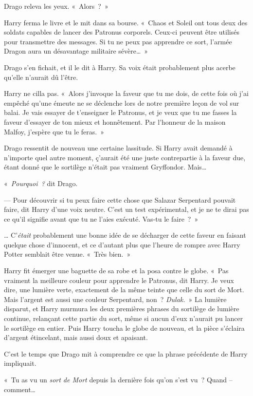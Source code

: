 Drago releva les yeux.
«~Alors~?~»

Harry ferma le livre et le mit dans sa bourse.
«~Chaos et Soleil ont tous deux des soldats capables de lancer des Patronus corporels.
Ceux-ci peuvent être utilisés pour transmettre des messages.
Si tu ne peux pas apprendre ce sort, l'armée Dragon aura un désavantage militaire sévère…~»

Drago s'en fichait, et il le dit à Harry.
Sa voix était probablement plus acerbe qu'elle n'aurait dû l'être.

Harry ne cilla pas.
«~Alors j'invoque la faveur que tu me dois, de cette fois où j'ai empêché qu'une émeute ne se déclenche lors de notre première leçon de vol sur balai.
Je vais essayer de t'enseigner le Patronus, et je veux que tu me fasses la faveur d'essayer de ton mieux et honnêtement.
Par l'honneur de la maison Malfoy, j'espère que tu le feras.~»

Drago ressentit de nouveau une certaine lassitude.
Si Harry avait demandé à n'importe quel autre moment, ç'aurait été une juste contrepartie à la faveur due, étant donné que le sortilège n'était pas vraiment Gryffondor.
Mais…

«~\emph{Pourquoi~?} dit Drago.

--- Pour découvrir si tu peux faire cette chose que Salazar Serpentard pouvait faire, dit Harry d'une voix neutre.
C'est un test expérimental, et je ne te dirai pas ce qu'il signifie avant que tu ne l'aies exécuté.
Vas-tu le faire~?~»

… C'\emph{était} probablement une bonne idée de se décharger de cette faveur en faisant quelque chose d'innocent, et ce d'autant plus que l'heure de rompre avec Harry Potter semblait être venue.
«~Très bien.~»

Harry fit émerger une baguette de sa robe et la posa contre le globe.
«~Pas vraiment la meilleure couleur pour apprendre le Patronus, dit Harry.
Je veux dire, une lumière verte, exactement de la même teinte que celle du sort de Mort.
Mais l'argent est aussi une couleur Serpentard, non~?
\emph{Dulak.}~» La lumière disparut, et Harry murmura les deux premières phrases du sortilège de lumière continue, relançant cette partie du sort, même si aucun d'eux n'aurait pu lancer le sortilège en entier.
Puis Harry toucha le globe de nouveau, et la pièce s'éclaira d'argent étincelant, mais aussi doux et apaisant.

C'est le temps que Drago mit à comprendre ce que la phrase précédente de Harry impliquait.

«~Tu as vu un \emph{sort de Mort} depuis la dernière fois qu'on s'est vu~?
Quand -- comment…

